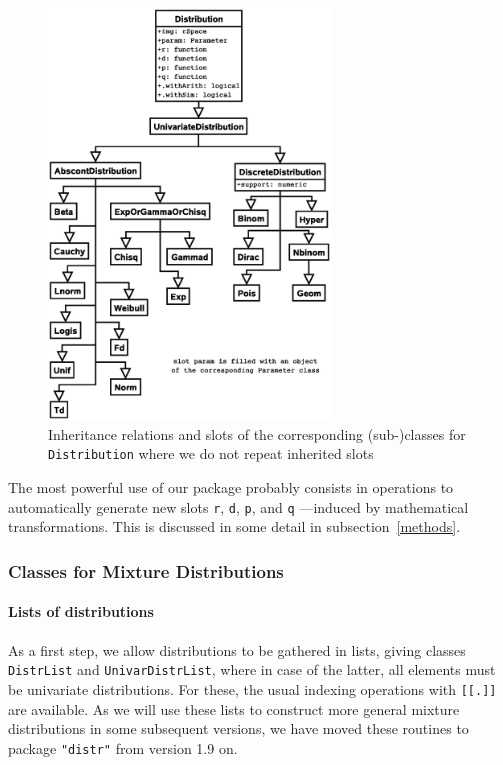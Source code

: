\documentclass[11pt]{article}
\newcommand{\code}[1]{{\tt #1}}
\newcommand{\pkg}[1]{{\tt "#1"}}
\begin{document}
\begin{figure}[htb]\label{fig1}
  \begin{center}
    \includegraphics[viewport=130 150 500 730,width=7.5cm]{distribution.ps}%
    \caption{\label{fig1c}{\footnotesize Inheritance relations and slots of the
    corresponding \mbox{(sub-)}classes for \code{Distribution} where we do not
    repeat inherited slots
    }}
  \end{center}
\vspace{-1ex}
\end{figure}
\fi

The most powerful use of our package probably consists in operations to
automatically generate new slots \code{r}, \code{d}, \code{p}, and \code{q}
---induced by mathematical transformations. This is discussed in some detail in
subsection~{\ref{methods}}.

\subsubsection{Classes for Mixture Distributions}

\paragraph{Lists of distributions}

As a first step, we allow distributions to be gathered in lists, giving
classes \code{DistrList} and \code{UnivarDistrList}, where in case of the latter,
all elements must be univariate distributions. For these, the usual indexing
operations with \code{[[.]]} are available. As we will use these lists to
construct more general mixture distributions in some subsequent versions, we
have moved these routines to package \pkg{distr} from version 1.9 on.
\end{document}
